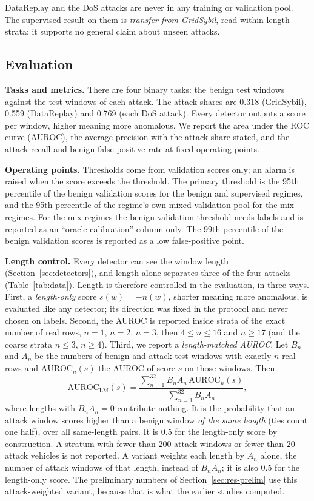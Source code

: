 DataReplay and the DoS attacks are never in any training or validation pool. The supervised result on them is
\emph{transfer from GridSybil}, read within length strata; it supports no general claim about unseen attacks.

\subsection{Evaluation}\label{sec:evaluation}

\textbf{Tasks and metrics.} There are four binary tasks: the benign test windows against the test windows of
each attack. The attack shares are 0.318 (GridSybil), 0.559 (DataReplay) and 0.769 (each DoS attack). Every
detector outputs a score per window, higher meaning more anomalous. We report the area under the ROC curve
(AUROC), the average precision with the attack share stated, and the attack recall and benign false-positive rate
at fixed operating points.

\textbf{Operating points.} Thresholds come from validation scores only; an alarm is raised when the score exceeds
the threshold. The primary threshold is the 95th percentile of the benign validation scores for the benign and
supervised regimes, and the 95th percentile of the regime's own mixed validation pool for the mix regimes. For
the mix regimes the benign-validation threshold needs labels and is reported as an ``oracle calibration'' column
only. The 99th percentile of the benign validation scores is reported as a low false-positive point.

\textbf{Length control.} Every detector can see the window length (Section~\ref{sec:detectors}), and length alone
separates three of the four attacks (Table~\ref{tab:data}). Length is therefore controlled in the evaluation, in
three ways. First, a \emph{length-only} score $s(w)=-n(w)$, shorter meaning more anomalous, is evaluated like any
detector; its direction was fixed in the protocol and never chosen on labels. Second, the AUROC is reported
inside strata of the exact number of real rows, $n=1$, $n=2$, $n=3$, then $4\le n\le16$ and $n\ge17$ (and the
coarse strata $n\le3$, $n\ge4$). Third, we report a \emph{length-matched AUROC}. Let $B_n$ and $A_n$ be the
numbers of benign and attack test windows with exactly $n$ real rows and $\mathrm{AUROC}_n(s)$ the AUROC of score
$s$ on those windows. Then
\begin{equation}\label{eq:lm}
\mathrm{AUROC}_{\mathrm{LM}}(s)=
\frac{\sum_{n=1}^{32} B_n A_n\,\mathrm{AUROC}_n(s)}{\sum_{n=1}^{32} B_n A_n},
\end{equation}
where lengths with $B_nA_n=0$ contribute nothing. It is the probability that an attack window scores higher than
a benign window \emph{of the same length} (ties count one half), over all same-length pairs. It is 0.5 for the
length-only score by construction. A stratum with fewer than 200 attack windows or fewer than 20 attack vehicles
is not reported. A variant weights each length by $A_n$ alone, the number of attack windows of that length,
instead of $B_nA_n$; it is also 0.5 for the length-only score. The preliminary numbers of
Section~\ref{sec:res-prelim} use this attack-weighted variant, because that is what the earlier studies computed.


